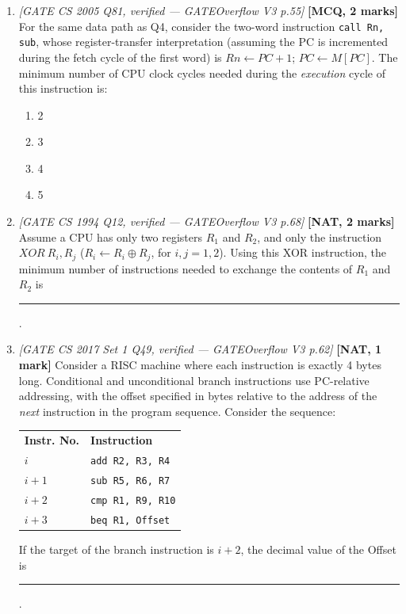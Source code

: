 \documentclass[11pt]{article}
\begin{document}
\begin{enumerate}
\item[\textbf{Q5}] \textit{[GATE CS 2005 Q81, verified --- GATEOverflow V3 p.55]} \textbf{[MCQ, 2 marks]} For the same data path as Q4, consider the two-word instruction \texttt{call Rn, sub}, whose register-transfer interpretation (assuming the PC is incremented during the fetch cycle of the first word) is $Rn \gets PC+1$; $PC \gets M[PC]$. The minimum number of CPU clock cycles needed during the \emph{execution} cycle of this instruction is:
\begin{enumerate}
  \item[(A)] 2
  \item[(B)] 3
  \item[(C)] 4
  \item[(D)] 5
\end{enumerate}

\item[\textbf{Q6}] \textit{[GATE CS 1994 Q12, verified --- GATEOverflow V3 p.68]} \textbf{[NAT, 2 marks]} Assume a CPU has only two registers $R_1$ and $R_2$, and only the instruction $XOR\ R_i, R_j$ ($R_i \gets R_i \oplus R_j$, for $i,j = 1, 2$). Using this XOR instruction, the minimum number of instructions needed to exchange the contents of $R_1$ and $R_2$ is \rule{1.5cm}{0.4pt}.

\item[\textbf{Q7}] \textit{[GATE CS 2017 Set 1 Q49, verified --- GATEOverflow V3 p.62]} \textbf{[NAT, 1 mark]} Consider a RISC machine where each instruction is exactly 4 bytes long. Conditional and unconditional branch instructions use PC-relative addressing, with the offset specified in bytes relative to the address of the \emph{next} instruction in the program sequence. Consider the sequence:
\begin{center}
\small
\begin{tabular}{ll}
\textbf{Instr. No.} & \textbf{Instruction} \\
$i$      & \texttt{add R2, R3, R4} \\
$i{+}1$  & \texttt{sub R5, R6, R7} \\
$i{+}2$  & \texttt{cmp R1, R9, R10} \\
$i{+}3$  & \texttt{beq R1, Offset} \\
\end{tabular}
\end{center}
If the target of the branch instruction is $i{+}2$, the decimal value of the Offset is \rule{1.5cm}{0.4pt}.


\end{enumerate}
\end{document}
